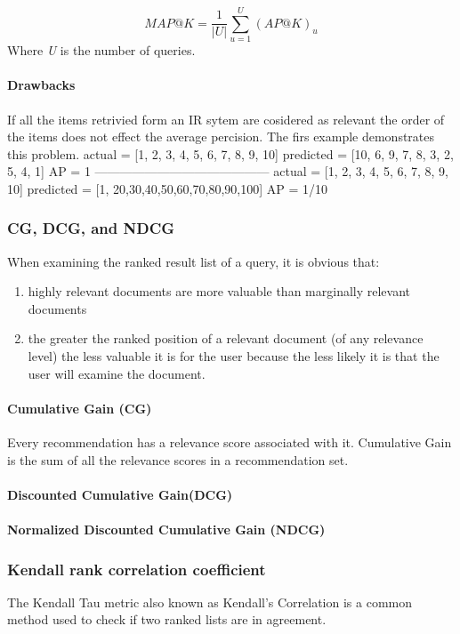 \begin{equation}
	MAP@K = \frac{1}{|U|}\sum_{u=1}^{U}(AP@K)_{u}
	\label{eq:map@k}
\end{equation}
Where \emph{U} is the number of queries.

\paragraph*{Drawbacks}
If all the items retrivied form an IR sytem are cosidered as relevant the order of the items does not effect the average percision.
 The firs example demonstrates this problem.
actual = [1, 2, 3, 4, 5, 6, 7, 8, 9, 10]
predicted = [10, 6, 9, 7, 8, 3, 2, 5, 4, 1]
AP = 1
------------------------------------------
actual = [1, 2, 3, 4, 5, 6, 7, 8, 9, 10]
predicted = [1, 20,30,40,50,60,70,80,90,100]
AP = 1/10

\subsubsection{CG, DCG, and NDCG}
\label{CG, DCG, and NDCG}
When examining the ranked result list of a query, it is obvious that:
\begin{enumerate}
	\item highly relevant documents are more valuable than marginally relevant documents
	\item the greater the ranked position of a relevant document (of any relevance level) the less valuable it is for the user because the less likely it is that the user will examine the document.
\end{enumerate}

\paragraph*{Cumulative Gain (CG)}
Every recommendation has a relevance score associated with it. Cumulative Gain is the sum of all the relevance scores in a recommendation set.

\paragraph*{Discounted Cumulative Gain(DCG)}


\paragraph*{Normalized Discounted Cumulative Gain (NDCG)}

\subsubsection{Kendall rank correlation coefficient}
The Kendall Tau metric also known as Kendall’s Correlation is a common method used to check if two ranked lists are in agreement.

